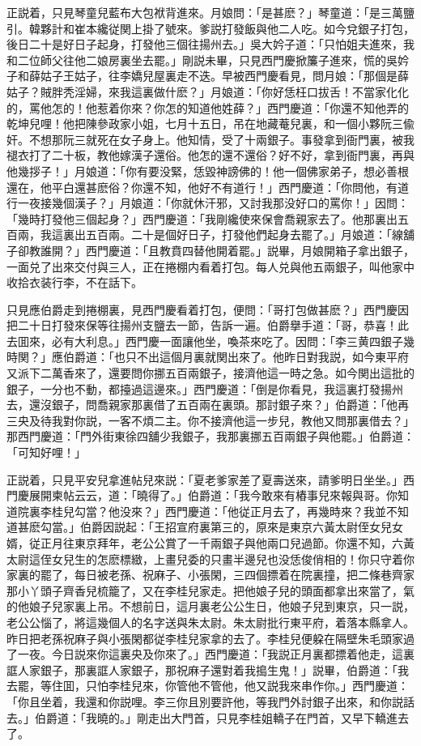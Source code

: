 正説着，只見琴童兒藍布大包袱背進來。月娘問：「是甚麽？」琴童道：「是三萬鹽引。韓夥計和崔本纔従関上掛了號來。爹説打發飯與他二人吃。如今兌銀子打包，後日二十是好日子起身，打發他三個往揚州去。」吳大妗子道：「只怕姐夫進來，我和二位師父往他二娘房裏坐去罷。」剛説未畢，只見西門慶掀簾子進來，慌的吳妗子和薛姑子王姑子，往李嬌兒屋裏走不迭。早被西門慶看見，問月娘：「那個是薛姑子？賊胖秃淫婦，來我這裏做什麽？」月娘道：「你好恁枉口拔舌！不當家化化的，罵他怎的！他惹着你來？你怎的知道他姓薛？」西門慶道：「你還不知他弄的乾坤兒哩！他把陳參政家小姐，七月十五日，吊在地藏菴兒裏，和一個小夥阮三偸奸。不想那阮三就死在女子身上。他知情，受了十兩銀子。事發拿到衙門裏，被我褪衣打了二十板，教他嫁漢子還俗。他怎的還不還俗？好不好，拿到衙門裏，再與他幾拶子！」月娘道：「你有要没緊，恁毀神謗佛的！他一個佛家弟子，想必善根還在，他平白還甚麽俗？你還不知，他好不有道行！」西門慶道：「你問他，有道行一夜接幾個漢子？」月娘道：「你就休汗邪，又討我那没好口的罵你！」因問：「幾時打發他三個起身？」西門慶道：「我剛纔使來保會喬親家去了。他那裏出五百兩，我這裏出五百兩。二十是個好日子，打發他們起身去罷了。」月娘道：「線舖子卻教誰開？」西門慶道：「且教賁四替他開着罷。」説畢，月娘開箱子拿出銀子，一面兑了出來交付與三人，正在捲棚内看着打包。每人兑與他五兩銀子，叫他家中收拾衣装行李，不在話下。

只見應伯爵走到捲棚裏，見西門慶看着打包，便問：「哥打包做甚麽？」西門慶因把二十日打發來保等往揚州支鹽去一節，告訴一遍。伯爵擧手道：「哥，恭喜！此去囬來，必有大利息。」西門慶一面讓他坐，喚茶來吃了。因問：「李三黄四銀子幾時関？」應伯爵道：「也只不出這個月裏就関出來了。他昨日對我説，如今東平府又派下二萬香來了，還要問你挪五百兩銀子，接濟他這一時之急。如今関出這批的銀子，一分也不動，都擡過這邊來。」西門慶道：「倒是你看見，我這裏打發揚州去，還沒銀子，問喬親家那裏借了五百兩在裏頭。那討銀子來？」伯爵道：「他再三央及待我對你説，一客不煩二主。你不接濟他這一步兒，教他又問那裏借去？」那西門慶道：「門外街東徐四舖少我銀子，我那裏挪五百兩銀子與他罷。」伯爵道：「可知好哩！」

正説着，只見平安兒拿進帖兒來説：「夏老爹家差了夏壽送來，請爹明日坐坐。」西門慶展開柬帖云云，道：「曉得了。」伯爵道：「我今敢來有樁事兒來報與哥。你知道院裏李桂兒勾當？他没來？」西門慶道：「他従正月去了，再幾時來？我並不知道甚麽勾當。」伯爵因説起：「王招宣府裏第三的，原來是東京六黃太尉侄女兒女婿，従正月往東京拜年，老公公賞了一千兩銀子與他兩口兒過節。你還不知，六黃太尉這侄女兒生的怎麽標緻，上畫兒委的只畫半邊兒也没恁俊俏相的！你只守着你家裏的罷了，每日被老孫、祝麻子、小張閑，三四個摽着在院裏撞，把二條巷齊家那小丫頭子齊香兒梳籠了，又在李桂兒家走。把他娘子兒的頭面都拿出來當了，氣的他娘子兒家裏上吊。不想前日，這月裏老公公生日，他娘子兒到東京，只一説，老公公惱了，將這幾個人的名字送與朱太尉。朱太尉批行東平府，着落本縣拿人。昨日把老孫祝麻子與小張閑都従李桂兒家拿的去了。李桂兒便躱在隔壁朱毛頭家過了一夜。今日説來你這裏央及你來了。」西門慶道：「我説正月裏都摽着他走，這裏誆人家銀子，那裏誆人家銀子，那祝麻子還對着我搗生鬼！」説畢，伯爵道：「我去罷，等住囬，只怕李桂兒來，你管他不管他，他又説我來串作你。」西門慶道：「你且坐着，我還和你説哩。李三你且別要許他，等我門外討銀子出來，和你説話去。」伯爵道：「我曉的。」剛走出大門首，只見李桂姐轎子在門首，又早下轎進去了。

